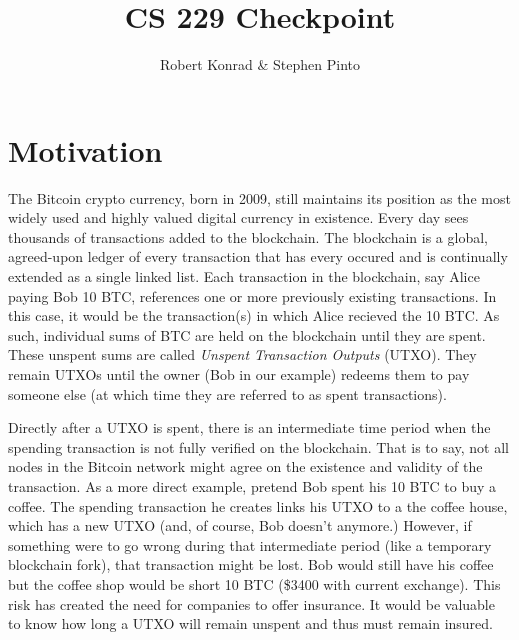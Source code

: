 \documentclass[12pt]{article}
\title{CS 229 Checkpoint}
\author{Robert Konrad \& Stephen Pinto}
\begin{document}
\maketitle

\section*{Motivation}
\label{sec:motivation}
The Bitcoin crypto currency, born in 2009, still maintains its position as the most widely used and highly valued digital currency in existence. Every day sees thousands of transactions added to the blockchain. The blockchain is a global, agreed-upon ledger of every transaction that has every occured and is continually extended as a single linked list. Each transaction in the blockchain, say Alice paying Bob 10 BTC, references one or more previously existing transactions. In this case, it would be the transaction(s) in which Alice recieved the 10 BTC. As such, individual sums of BTC are held on the blockchain until they are spent. These unspent sums are called \emph{Unspent Transaction Outputs} (UTXO). They remain UTXOs until the owner (Bob in our example) redeems them to pay someone else (at which time they are referred to as spent transactions).

Directly after a UTXO is spent, there is an intermediate time period when the spending transaction is not fully verified on the blockchain. That is to say, not all nodes in the Bitcoin network might agree on the existence and validity of the transaction. As a more direct example, pretend Bob spent his 10 BTC to buy a coffee. The spending transaction he creates links his UTXO to a the coffee house, which has a new UTXO (and, of course, Bob doesn't anymore.) However, if something were to go wrong during that intermediate period (like a temporary blockchain fork), that transaction might be lost. Bob would still have his coffee but the coffee shop would be short 10 BTC (\$3400 with current exchange). This risk has created the need for companies to offer insurance. It would be valuable to know how long a UTXO will remain unspent and thus must remain insured.
\end{document}
